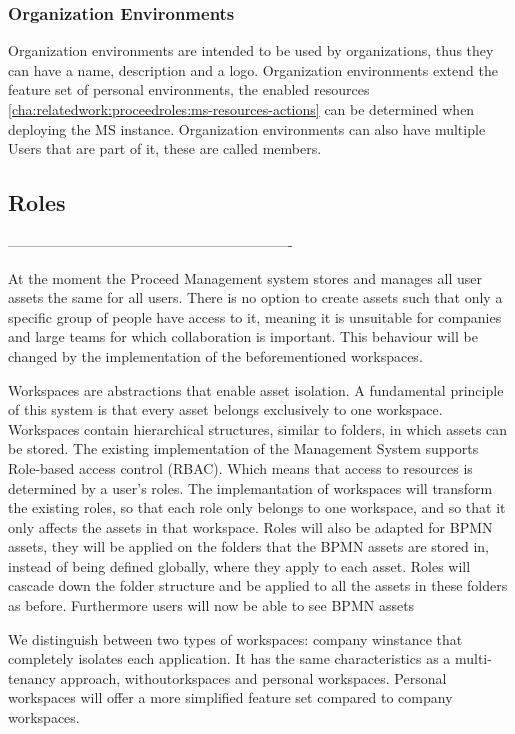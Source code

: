 \subsubsection{Organization Environments}
\label{cha:conceptanddesign:environments:organization}

Organization environments are intended to be used by organizations, thus they can have a
name, description and a logo.
Organization environments extend the feature set of personal environments, the enabled
resources \ref{cha:relatedwork:proceedroles:ms-resources-actions} can be determined when
deploying the MS instance.
Organization environments can also have multiple Users that are part of it, these are
called members.

\subsection{Roles}




-------------------------------------------------------------



At the moment the Proceed Management system stores and manages all user assets the same for all users.
There is no option to create assets such that only a specific group of people have access to it, meaning it is unsuitable for companies and large teams for which collaboration is important.
This behaviour will be changed by the implementation of the beforementioned workspaces.

Workspaces are abstractions that enable asset isolation.
A fundamental principle of this system is that every asset belongs exclusively to one workspace.
Workspaces contain hierarchical structures, similar to folders, in which assets can be stored.
The existing implementation of the Management System supports Role-based access control (RBAC).
Which means that access to resources is determined by a user's roles.
The implemantation of workspaces will transform the existing roles, so that each role only belongs to one workspace, and so that it only affects the assets in that workspace.
Roles will also be adapted for BPMN assets, they will be applied on the folders that the BPMN assets are stored in, instead of being defined globally, where they apply to each asset.
Roles will cascade down the folder structure and be applied to all the assets in these folders as before.
Furthermore users will now be able to see BPMN assets 

We distinguish between two types of workspaces: company winstance that completely isolates each application. It has
the same characteristics as a multi-tenancy approach, withoutorkspaces and personal workspaces.
Personal workspaces will offer a more simplified feature set compared to company workspaces.

